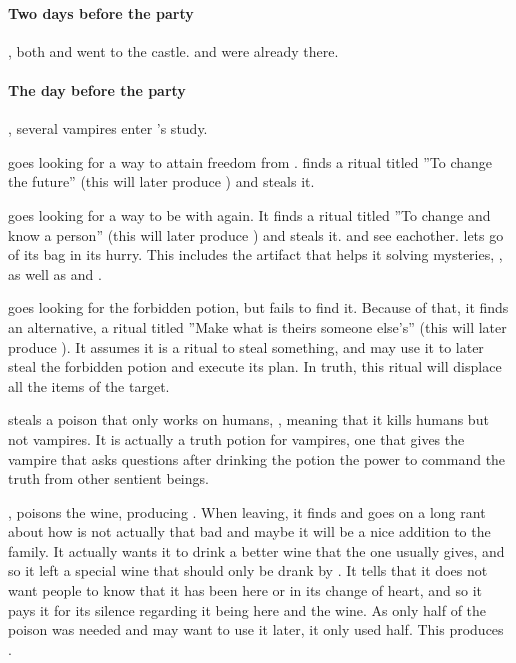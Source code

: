 \paragraph{Two days before the party}

, both  and  went to the castle.  and  were already there.

\paragraph{The day before the party}

, several vampires enter 's study.

 goes looking for a way to attain freedom from .  finds a ritual titled ''To change the future'' (this will later produce ) and steals it. 

 goes looking for a way to be with  again. It finds a ritual titled ''To change and know a person'' (this will later produce ) and steals it.  and  see eachother.  lets go of its bag in its hurry. This includes the artifact that helps it solving mysteries, , as well as  and .

 goes looking for the forbidden potion, but fails to find it. Because of that, it finds an alternative, a ritual titled ''Make what is theirs someone else's'' (this will later produce ). It assumes it is a ritual to steal something, and may use it to later steal the forbidden potion and execute its plan. In truth, this ritual will displace all the items of the target.

 steals a poison that only works on humans, , meaning that it kills humans but not vampires. It is actually a truth potion for vampires, one that gives the vampire that asks questions after drinking the potion the power to command the truth from other sentient beings.


,  poisons the wine, producing . When leaving, it finds  and goes on a long rant about how  is not actually that bad and maybe it will be a nice addition to the family. It actually wants it to drink a better wine that the one  usually gives, and so it left a special wine that should only be drank by . It tells  that it does not want people to know that it has been here or in its change of heart, and so it pays it for its silence regarding it being here and the wine. As only half of the poison was needed and  may want to use it later, it only used half. This produces .


